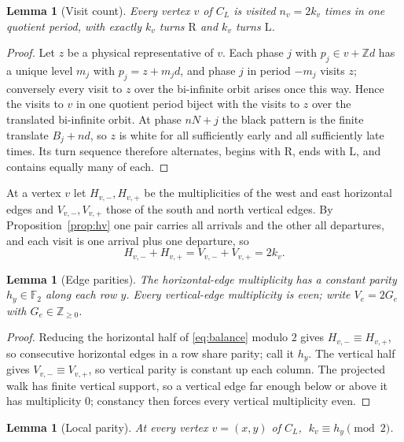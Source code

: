 \documentclass[11pt,reqno]{amsart}
\theoremstyle{plain}
\newtheorem{lemma}[theorem]{Lemma}
\theoremstyle{definition}
\newcommand{\Z}{\mathbb{Z}}
\newcommand{\F}{\mathbb{F}}
\newcommand{\drift}{d}
\newcommand{\turnR}{\mathrm{R}}
\newcommand{\turnL}{\mathrm{L}}
\begin{document}
\begin{lemma}[Visit count]\label{lem:visit}
Every vertex $v$ of $C_L$ is visited $n_v=2k_v$ times in one quotient period, with
exactly $k_v$ turns $\turnR$ and $k_v$ turns $\turnL$.
\end{lemma}

\begin{proof}
Let $z$ be a physical representative of $v$. Each phase $j$ with $p_j\in v+\Z\drift$
has a unique level $m_j$ with $p_j=z+m_j\drift$, and phase $j$ in period $-m_j$ visits
$z$; conversely every visit to $z$ over the bi-infinite orbit arises once this way.
Hence the visits to $v$ in one quotient period biject with the visits to $z$ over the
translated bi-infinite orbit. At phase $nN+j$ the black pattern is the finite translate
$B_j+n\drift$, so $z$ is white for all sufficiently early and all sufficiently
late times. Its turn sequence therefore alternates, begins with $\turnR$, ends with
$\turnL$, and contains equally many of each.
\end{proof}

At a vertex $v$ let $H_{v,-},H_{v,+}$ be the multiplicities of the west and east
horizontal edges and $V_{v,-},V_{v,+}$ those of the south and north vertical edges.
By Proposition~\ref{prop:hv} one pair carries all arrivals and the other all
departures, and each visit is one arrival plus one departure, so
\begin{equation}\label{eq:balance}
H_{v,-}+H_{v,+}=V_{v,-}+V_{v,+}=2k_v .
\end{equation}

\begin{lemma}[Edge parities]\label{lem:edgeparity}
The horizontal-edge multiplicity has a constant parity $h_y\in\F_2$ along each row
$y$. Every vertical-edge multiplicity is even; write $V_e=2G_e$ with $G_e\in\Z_{\ge0}$.
\end{lemma}

\begin{proof}
Reducing the horizontal half of \eqref{eq:balance} modulo $2$ gives
$H_{v,-}\equiv H_{v,+}$, so consecutive horizontal edges in a row share parity;
call it $h_y$. The vertical half gives $V_{v,-}\equiv V_{v,+}$, so vertical parity is
constant up each column. The projected walk has finite vertical support, so a
vertical edge far enough below or above it has multiplicity $0$; constancy then forces
every vertical multiplicity even.
\end{proof}

\begin{lemma}[Local parity]\label{lem:localparity}
At every vertex $v=(x,y)$ of $C_L$, $\;k_v\equiv h_y\pmod2$.
\end{lemma}
\end{document}

